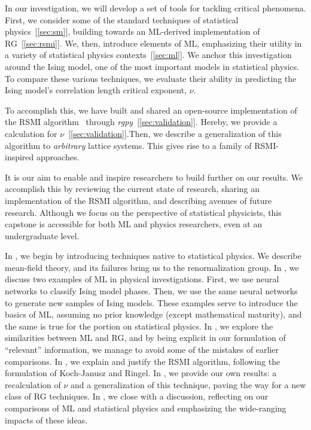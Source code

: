 In our investigation, we will develop a set of tools for tackling
critical phenomena. First, we consider some of the standard techniques
of statistical physics~[\ref{sec:sm}], building towards an ML-derived
implementation of RG~[\ref{sec:rsmi}].  We, then, introduce elements
of ML, emphasizing their utility in a variety of statistical physics
contexts~[\ref{sec:ml}]. We anchor this investigation around the Ising
model, one of the most important models in statistical physics. To
compare these various techniques, we evaluate their ability in
predicting the Ising model's correlation length critical exponent,
$\nu$.

To accomplish this, we have built and shared an open-source
implementation of the RSMI algorithm~\cite{rgpy} through
\textit{rgpy}~[\ref{sec:validation}]. Hereby, we provide a calculation
for $\nu$~[\ref{sec:validation}].Then, we describe a generalization of
this algorithm to \textit{arbitrary} lattice systems. This gives rise
to a family of RSMI-inspired approaches.

It is our aim to enable and inspire researchers to build further on
our results. We accomplish this by reviewing the current state of
research, sharing an implementation of the RSMI algorithm, and
describing avenues of future research. Although we focus on the
perspective of statistical physicists, this capstone is accessible for
both ML and physics researchers, even at an undergraduate level.

In , we begin by introducing techniques native to
statistical physics. We describe mean-field theory, and its failures
bring us to the renormalization group. In , we discuss
two examples of ML in physical investigations.  First, we use neural
networks to classify Ising model phases. Then, we use the same neural
networks to generate new samples of Ising models. These examples serve
to introduce the basics of ML, assuming no prior knowledge (except
mathematical maturity), and the same is true for the portion on
statistical physics. In , we explore the
similarities between ML and RG, and by being explicit in our
formulation of ``relevant'' information, we manage to avoid some of
the mistakes of earlier comparisons. In , we explain
and justify the RSMI algorithm, following the formulation of
Koch-Janusz and Ringel. In , we provide our own
results: a recalculation of $\nu$ and a generalization of this
technique, paving the way for a new class of RG techniques. In
, we close with a discussion, reflecting on our
comparisons of ML and statistical physics and emphasizing the
wide-ranging impacts of these ideas.


